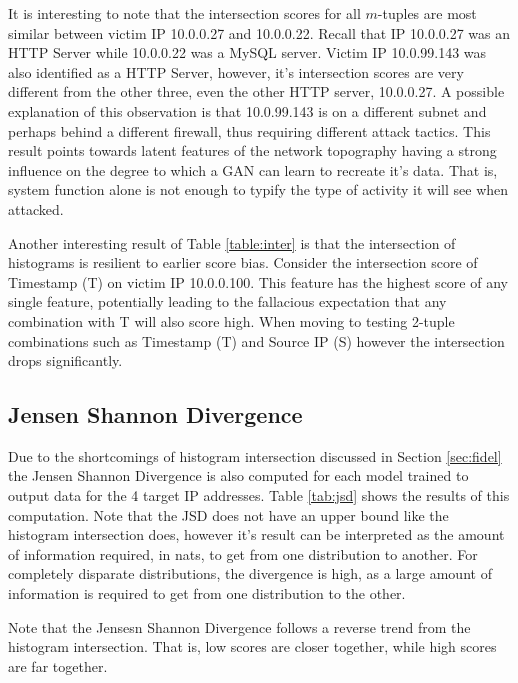 It is interesting to note that the intersection scores for all $m$-tuples are most similar between victim IP 10.0.0.27 and 10.0.0.22. Recall that IP 10.0.0.27 was an HTTP Server while 10.0.0.22 was a MySQL server. Victim IP 10.0.99.143 was also identified as a HTTP Server, however, it's intersection scores are very different from the other three, even the other HTTP server, 10.0.0.27. A possible explanation of this observation is that 10.0.99.143 is on a different subnet and perhaps behind a different firewall, thus requiring different attack tactics. This result points towards latent features of the network topography having a strong influence on the degree to which a GAN can learn to recreate it's data. That is, system function alone is not enough to typify the type of activity it will see when attacked.

Another interesting result of Table \ref{table:inter} is that the intersection of histograms is resilient to earlier score bias. Consider the intersection score of Timestamp (T) on victim IP 10.0.0.100. This feature has the highest score of any single feature, potentially leading to the fallacious expectation that any combination with T will also score high. When moving to testing 2-tuple combinations such as Timestamp (T) and Source IP (S) however the intersection drops significantly.

\subsection{Jensen Shannon Divergence}

Due to the shortcomings of histogram intersection discussed in Section \ref{sec:fidel} the Jensen Shannon Divergence is also computed for each model trained to output data for the 4 target IP addresses. Table \ref{tab:jsd} shows the results of this computation. Note that the JSD does not have an upper bound like the histogram intersection does, however it's result can be interpreted as the amount of information required, in nats, to get from one distribution to another. For completely disparate distributions, the divergence is high, as a large amount of information is required to get from one distribution to the other.

Note that the Jensesn Shannon Divergence follows a reverse trend from the histogram intersection. That is, low scores are closer together, while high scores are far together.


